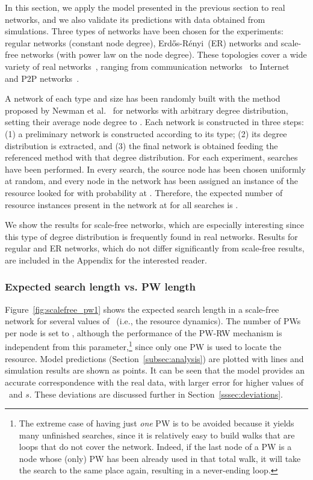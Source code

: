 \documentclass[]{elsarticle}
\newcommand{\ER}	{Erd\H{o}s-R\'{e}nyi}
\newcommand{\s}		{\ensuremath{s}}		\newcommand{\sopt}	{\ensuremath{s_{opt}}}		\newcommand{\p}		{\ensuremath{p}}		\newcommand{\W}		{\ensuremath{W}}		\newcommand{\w}		{\ensuremath{w}}		\newcommand{\lsave}	{\ensuremath{\overline{l}_s}}	\newcommand{\lave}	{\ensuremath{\overline{l}}}	\newcommand{\lopt}	{\ensuremath{\overline{l}_{opt}}}
\begin{document}
In this section, we apply the model presented in the previous section to real networks, and we also validate its predictions with data obtained from simulations. Three types of networks have been chosen for the experiments: regular networks (constant node degree), \ER\ (ER) networks and scale-free networks (with power law on the node degree). These topologies cover a wide variety of real networks~\cite{Albert2002}, ranging from communication networks~\cite{Aiello:2000:RGM:335305.335326} to Internet~\cite{Pastor-Satorras:2004:ESI:1076357} and P2P networks~\cite{Jovanovic:2001}.





A network of each type and size  has been randomly built with the method proposed by Newman et al.~\cite{nets:Newman01} for networks with arbitrary degree distribution, setting their average node degree to . Each network is constructed in three steps: (1) a preliminary network is constructed according to its type; (2) its degree distribution is extracted, and (3) the final network is obtained feeding the referenced method with that degree distribution. For each experiment,  searches have been performed. In every search, the source node has been chosen uniformly at random, and every node in the network has been assigned an instance of the resource looked for with probability  at . Therefore, the expected number of resource instances present in the network at  for all searches is .

We show the results for scale-free networks, which are especially interesting since this type of degree distribution is frequently found in real networks.  Results for regular and ER networks, which do not differ significantly from scale-free results, are included in the Appendix for the interested reader. \\


\subsubsection{Expected search length vs. PW length}

Figure~\ref{fig:scalefree_pw1} shows the expected search length in a scale-free network for several values of \pd\ (i.e., the resource dynamics).
The number of PWs per node is set to , although the performance of the PW-RW mechanism is independent from this parameter,\footnote{
The extreme case of having just \emph{one} PW is to be avoided because it yields many unfinished searches, since it is relatively easy to build walks that are loops that do not cover the network. Indeed, if the last node of a PW is a node whose (only) PW has been already used in that total walk, it will take the search to the same place again, resulting in a never-ending loop.} since only one PW is used to locate the resource.
Model predictions (Section~\ref{subsec:analysis}) are plotted with lines and simulation results are shown as points. It can be seen that the model provides an accurate correspondence with the real data, with larger error for higher values of \pd\ and \s. These deviations are discussed further in Section~\ref{sssec:deviations}.
\end{document}
